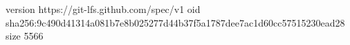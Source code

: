 version https://git-lfs.github.com/spec/v1
oid sha256:9c490d41314a081b7e8b025277d44b37f5a1787dee7ac1d60cc57515230ead28
size 5566
